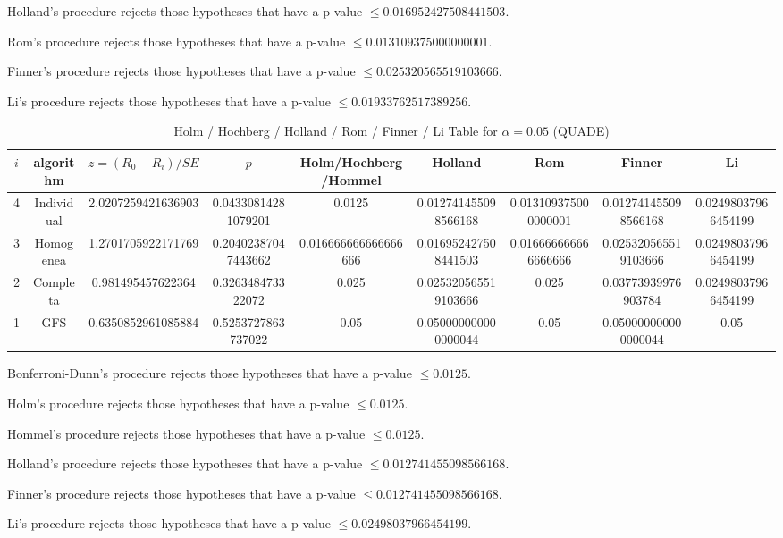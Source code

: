 \documentclass[a4paper,10pt]{article}
\begin{document}
\begin{landscape}
Holland's procedure rejects those hypotheses that have a p-value $\le0.016952427508441503$.


Rom's procedure rejects those hypotheses that have a p-value $\le0.013109375000000001$.


Finner's procedure rejects those hypotheses that have a p-value $\le0.025320565519103666$.


Li's procedure rejects those hypotheses that have a p-value $\le0.01933762517389256$.



\newpage

\begin{table}[!htp]
\centering\scriptsize
\caption{Holm / Hochberg / Holland / Rom / Finner / Li Table for $\alpha=0.05$ (QUADE)}
\begin{tabular}{ccccccccc}
$i$&algorithm&$z=(R_0 - R_i)/SE$&$p$&Holm/Hochberg/Hommel&Holland&Rom&Finner&Li\\
\hline
4&Individual&2.0207259421636903&0.04330814281079201&0.0125&0.012741455098566168&0.013109375000000001&0.012741455098566168&0.02498037966454199\\
3&Homogenea&1.2701705922171769&0.20402387047443662&0.016666666666666666&0.016952427508441503&0.016666666666666666&0.025320565519103666&0.02498037966454199\\
2&Completa&0.981495457622364&0.326348473322072&0.025&0.025320565519103666&0.025&0.03773939976903784&0.02498037966454199\\
1&GFS&0.6350852961085884&0.5253727863737022&0.05&0.050000000000000044&0.05&0.050000000000000044&0.05\\
\hline
\end{tabular}
\end{table}
Bonferroni-Dunn's procedure rejects those hypotheses that have a p-value $\le0.0125$.


Holm's procedure rejects those hypotheses that have a p-value $\le0.0125$.


Hommel's procedure rejects those hypotheses that have a p-value $\le0.0125$.


Holland's procedure rejects those hypotheses that have a p-value $\le0.012741455098566168$.


Finner's procedure rejects those hypotheses that have a p-value $\le0.012741455098566168$.


Li's procedure rejects those hypotheses that have a p-value $\le0.02498037966454199$.



\newpage


\end{landscape}
\end{document}
